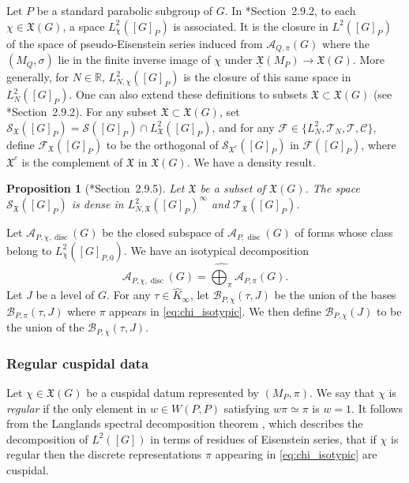 \documentclass[letterpaper,11pt]{amsart}
\newcommand{\fX}{\mathfrak{X}}
\newcommand{\R}{\mathbb{R}}
\newcommand{\cA}{\mathcal{A}}
\newcommand{\cB}{\mathcal{B}}
\newcommand{\cC}{\mathcal{C}}
\newcommand{\cF}{\mathcal{F}}
\newcommand{\cS}{\mathcal{S}}
\newcommand{\cT}{\mathcal{T}}
\newcommand{\<}{\negthickspace}
\DeclareMathOperator{\disc}{disc}
\theoremstyle{definition}
\theoremstyle{plain}
\newtheorem{prop}[definition]{Proposition}
\theoremstyle{remark}
\numberwithin{equation}{section}
\begin{document}
Let $P$ be a standard parabolic subgroup of $G$. In \cite{BPCZ}*{Section~2.9.2}, to each $\chi \in \fX(G)$, a space $L^2_\chi([G]_P)$ is associated. It is the closure in $L^2([G]_P)$ of the space of pseudo-Eisenstein series induced from $\cA_{Q,\pi}(G)$ where the $(M_Q,\sigma)$ lie in the finite inverse image of $\chi$ under $\underline{\fX}(M_P) \to \fX(G)$. More generally, for $N \in \R$, $L_{N,\chi}^2([G]_P)$ is the closure of this same space in $L_N^2([G]_P)$. One can also extend these definitions to subsets $\fX \subset \fX(G)$ (see \cite{BPCZ}*{Section~2.9.2}). For any subset $\fX \subset \fX(G)$, set $\cS_{\fX}([G]_P)=\cS([G]_P) \cap L^2_{\fX}([G]_P)$, and for any $\cF \in \{L^2_N, \cT_N, \cT, \cC\}$, define $\cF_{\fX}([G]_P)$ to be the orthogonal of $\cS_{\fX^c}([G]_P)$ in $\cF([G]_P)$, where $\fX^c$ is the complement of $\fX$ in $\fX(G)$. We have a density result.
\begin{prop}[\cite{BPCZ}*{Section~2.9.5}]
\label{prop:density_schwartz}
    Let $\fX$ be a subset of $\fX(G)$. The space $\cS_{\fX}([G]_P)$ is dense in $L^2_{N,\fX}([G]_P)^\infty$ and $\cT_{\fX}([G]_P)$.
\end{prop}

Let $\cA_{P,\chi,\disc}(G)$ be the closed subspace of $\cA_{P,\disc}(G)$ of forms whose class belong to $L_\chi^2([G]_{P,0})$. We have an isotypical decomposition 
\begin{equation}
    \label{eq:chi_isotypic}
    \cA_{P,\chi,\disc}(G)=\widehat{\bigoplus_\pi} \cA_{P,\pi}(G).
\end{equation}
Let $J$ be a level of $G$. For any $\tau \in \widehat{K}_\infty$, let $\cB_{P,\chi}(\tau,J)$ be the union of the bases $\cB_{P,\pi}(\tau,J)$ where $\pi$ appears in \eqref{eq:chi_isotypic}. We then define $\cB_{P,\chi}(J)$ to be the union of the $\cB_{P,\chi}(\tau,J)$. 

\subsubsection{Regular cuspidal data}
\label{subsec:reg_cusp_data}
Let $\chi \in \fX(G)$ be a cuspidal datum represented by $(M_P,\pi)$. We say that $\chi$ is \emph{regular} if the only element in $w \in W(P,P)$ satisfying $w \pi \simeq \pi$ is $w=1$. It follows from the Langlands spectral decomposition theorem \cite{Langlands}, which describes the decomposition of $L^2([G])$ in terms of residues of Eisenstein series, that if $\chi$ is regular then the discrete representations $\pi$ appearing in \eqref{eq:chi_isotypic} are cuspidal.
\end{document}
